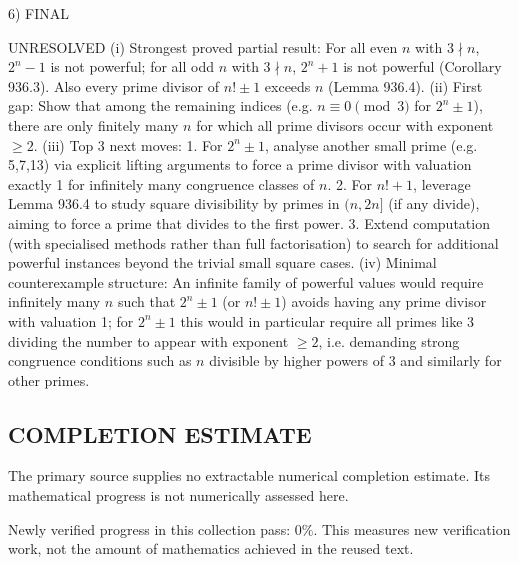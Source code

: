 6) FINAL

UNRESOLVED
(i) Strongest proved partial result: For all even \(n\) with \(3\nmid n\), \(2^n-1\) is not powerful; for all odd \(n\) with \(3\nmid n\), \(2^n+1\) is not powerful (Corollary 936.3). Also every prime divisor of \(n!\pm 1\) exceeds \(n\) (Lemma 936.4).
(ii) First gap: Show that among the remaining indices (e.g. \(n\equiv 0\pmod 3\) for \(2^n\pm 1\)), there are only finitely many \(n\) for which all prime divisors occur with exponent \(\ge 2\).
(iii) Top 3 next moves:
  1. For \(2^n\pm 1\), analyse another small prime (e.g. 5,7,13) via explicit lifting arguments to force a prime divisor with valuation exactly 1 for infinitely many congruence classes of \(n\).
  2. For \(n!+1\), leverage Lemma 936.4 to study square divisibility by primes in \((n,2n]\) (if any divide), aiming to force a prime that divides to the first power.
  3. Extend computation (with specialised methods rather than full factorisation) to search for additional powerful instances beyond the trivial small square cases.
(iv) Minimal counterexample structure: An infinite family of powerful values would require infinitely many \(n\) such that \(2^n\pm 1\) (or \(n!\pm 1\)) avoids having any prime divisor with valuation 1; for \(2^n\pm 1\) this would in particular require all primes like 3 dividing the number to appear with exponent \(\ge2\), i.e. demanding strong congruence conditions such as \(n\) divisible by higher powers of 3 and similarly for other primes.




\subsection*{COMPLETION ESTIMATE}
The primary source supplies no extractable numerical completion estimate. Its mathematical progress is not numerically assessed here.

Newly verified progress in this collection pass: $0\%$. This measures new verification work, not the amount of mathematics achieved in the reused text.
